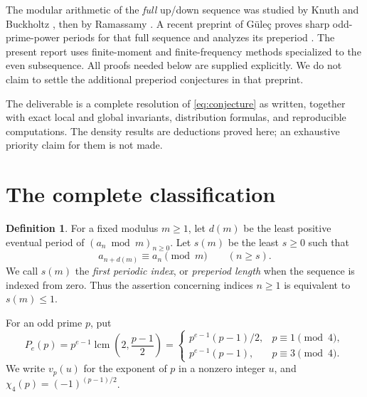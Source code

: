 \documentclass[11pt,a4paper]{article}
\numberwithin{equation}{section}
\theoremstyle{definition}
\newtheorem{definition}[theorem]{Definition}
\DeclareMathOperator{\lcm}{lcm}
\begin{document}
The modular arithmetic of the \emph{full} up/down sequence was studied by
Knuth and Buckholtz \cite{knuth}, then by Ramassamy \cite{ramassamy}.
A recent preprint of G\"ule\c{c} proves sharp odd-prime-power periods for
that full sequence and analyzes its preperiod \cite{gulec}. The present
report uses finite-moment and finite-frequency methods specialized to the
even subsequence. All proofs needed below are supplied explicitly.
We do not claim to settle the additional preperiod conjectures in that
preprint.

The deliverable is a complete resolution of \eqref{eq:conjecture} as
written, together with exact local and global invariants, distribution
formulas, and reproducible computations. The density results are deductions
proved here; an exhaustive priority claim for them is not made.

\section{The complete classification}
\label{sec:main}

\begin{definition}
For a fixed modulus $m\ge1$, let $d(m)$ be the least positive eventual
period of $(a_n\bmod m)_{n\ge0}$. Let $s(m)$ be the least $s\ge0$ such that
\[
a_{n+d(m)}\equiv a_n\pmod m\qquad(n\ge s).
\]
We call $s(m)$ the \emph{first periodic index}, or \emph{preperiod length}
when the sequence is indexed from zero. Thus the assertion concerning
indices $n\ge1$ is equivalent to $s(m)\le1$.
\end{definition}

For an odd prime $p$, put
\begin{equation}\label{eq:P}
P_e(p)=p^{e-1}\lcm\left(2,\frac{p-1}{2}\right)
=\begin{cases}
 p^{e-1}(p-1)/2,&p\equiv1\pmod4,\\
 p^{e-1}(p-1),&p\equiv3\pmod4.
\end{cases}
\end{equation}
We write $v_p(u)$ for the exponent of $p$ in a nonzero integer $u$, and
$\chi_4(p)=(-1)^{(p-1)/2}$.
\end{document}
